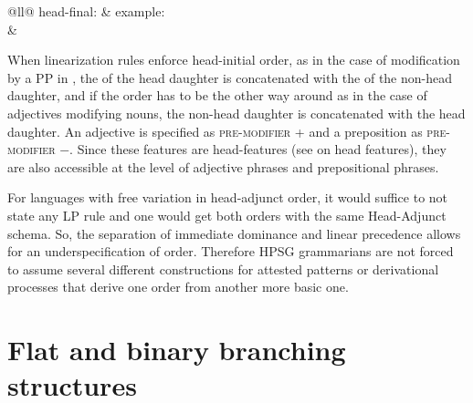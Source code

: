 \documentclass[output=paper
	        ,collection
	        ,collectionchapter
 	        ,biblatex
                ,babelshorthands
                ,newtxmath
                ,draftmode
                ,colorlinks, citecolor=brown
]{langscibook}
\begin{document}
\ex \begin{tabular}[t]{@{}ll@{}}
head-final:                            & example:\\
%
&%
\\
\end{tabular}
\zl
When linearization rules enforce head-initial order, as in the case of modification by a PP in
, the \phonv of the head daughter is concatenated with the \phonv of the non-head daughter,
and if the order has to be the other way around as in the case of adjectives modifying nouns, the
non-head daughter is concatenated with the head daughter. An adjective is specified as
\textsc{pre-modifier} + and a preposition as \textsc{pre-modifier} $-$. Since these features are
head-features (see  on head features), they are also accessible at the
level of adjective phrases and prepositional phrases.

For languages with free variation in head-adjunct order, it would suffice to not state any LP
rule and one would get both orders with the same Head-Adjunct schema. So, the separation of
immediate dominance and linear precedence allows for an underspecification of order. Therefore HPSG
grammarians are not forced to assume several different constructions for attested patterns or
derivational processes that derive one order from another more basic one.


\section{Flat and binary branching structures}
\label{sec-binary-flat}
\end{document}
